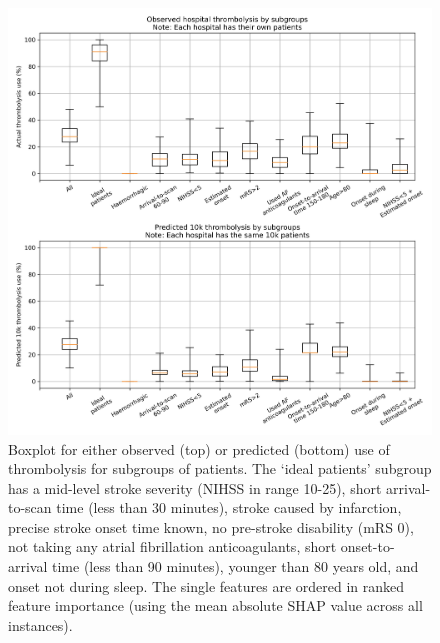 \begin{figure}[!h]
\centering
\includegraphics[width=1\textwidth]{./images/04c_xgb_10_features_10k_cohort_actual_vs_modelled_subgroup_boxplot}
\caption{Boxplot for either observed (top) or predicted (bottom) use of thrombolysis for subgroups of patients. The `ideal patients' subgroup has a mid-level stroke severity (NIHSS in range 10-25), short arrival-to-scan time (less than 30 minutes), stroke caused by infarction, precise stroke onset time known, no pre-stroke disability (mRS 0), not taking any atrial fibrillation anticoagulants, short onset-to-arrival time (less than 90 minutes), younger than 80 years old, and onset not during sleep. The single features are ordered in ranked feature importance (using the mean absolute SHAP value across all instances). }
\label{fig:results_boxplot}
\end{figure}